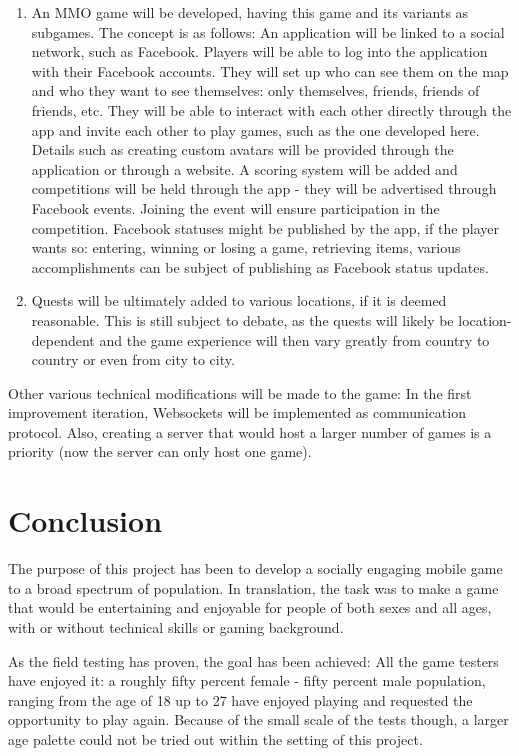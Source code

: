 \begin{enumerate}
  \item An MMO game will be developed, having this game and its variants as
  subgames. The concept is as follows: An application will be linked to a social
  network, such as Facebook. Players will be able to log into the application
  with their Facebook accounts. They will set up who can see them on the map and
  who they want to see themselves: only themselves, friends, friends of friends,
  etc. They will be able to interact with each other directly through the app
  and invite each other to play games, such as the one developed here. Details
  such as creating custom avatars will be provided through the application or
  through a website. A scoring system will be added and competitions will be
  held through the app - they will be advertised through Facebook events.
  Joining the event will ensure participation in the competition. Facebook
  statuses might be published by the app, if the player wants so: entering,
  winning or losing a game, retrieving items, various accomplishments can be
  subject of publishing as Facebook status updates.
  
  \item Quests will be ultimately added to various locations, if it is deemed
  reasonable. This is still subject to debate, as the quests will likely be
  location-dependent and the game experience will then vary greatly from
  country to country or even from city to city.
  
\end{enumerate}

Other various technical modifications will be made to the game: In the first
improvement iteration, Websockets will be implemented as communication protocol.
Also, creating a server that would host a larger number of games is a priority
(now the server can only host one game).


\section{Conclusion}

The purpose of this project has been to develop a socially engaging mobile game
to a broad spectrum of population. In translation, the task was to make a game
that would be entertaining and enjoyable for people of both sexes and all ages,
with or without technical skills or gaming background. \newline

As the field testing has proven, the goal has been achieved: All the game
testers have enjoyed it: a roughly fifty percent female - fifty percent male
population, ranging from the age of 18 up to 27 have enjoyed playing and
requested the opportunity to play again. Because of the small scale of the
tests though, a larger age palette could not be tried out within the setting of
this project.\newline

